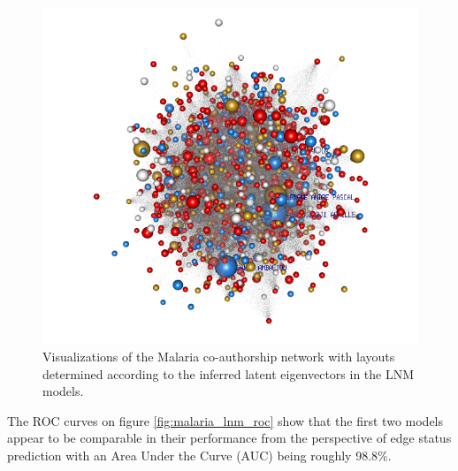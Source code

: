 \begin{figure}[!h]
\includegraphics[scale=0.3]{Chapters/malaria/statMod/lnm_mod6_all.png}
\caption{Visualizations of the Malaria co-authorship network with layouts determined according to the inferred latent eigenvectors in the LNM models.
}
\label{fig:malaria_lnm_viz}
\end{figure}

The ROC curves on figure \ref{fig:malaria_lnm_roc} show that the first two models appear to be comparable in their performance from the perspective of edge status prediction with an Area Under the Curve (AUC) being roughly 98.8\%. %

